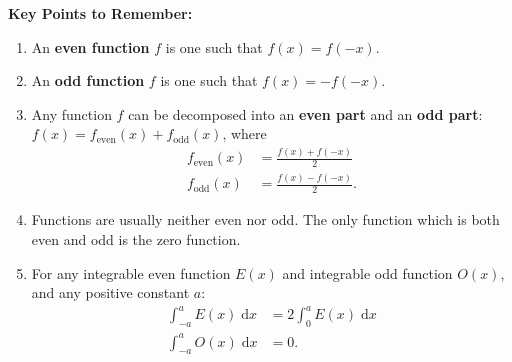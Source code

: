 \documentclass{article}
\newcommand{\diff}{\;\mathrm{d}}
\begin{document}
\clearpage




{\bf Key Points to Remember:}

\vspace{5mm}

\begin{enumerate}
	\item An \textbf{even function} $f$ is one such that $f(x)=f(-x)$.
	\item An \textbf{odd function} $f$ is one such that $f(x)=-f(-x)$.
	\item Any function $f$ can be decomposed into an \textbf{even part} and an \textbf{odd part}: $f(x)=f_\mathrm{even}(x)+f_\mathrm{odd}(x)$, where
		\begin{align*}
			f_\mathrm{even}(x)&=\frac{f(x)+f(-x)}{2}\\
			f_\mathrm{odd}(x)&=\frac{f(x)-f(-x)}{2}.
		\end{align*}
	\item Functions are usually neither even nor odd. The only function which is both even and odd is the zero function.
	\item For any integrable even function $E(x)$ and integrable odd function $O(x)$, and any positive constant $a$:
		\begin{align*}
			\int_{-a}^a E(x)\diff x &= 2\int_0^a E(x)\diff x\\
			\int_{-a}^a O(x)\diff x &= 0.
		\end{align*}
\end{enumerate}
\end{document}
